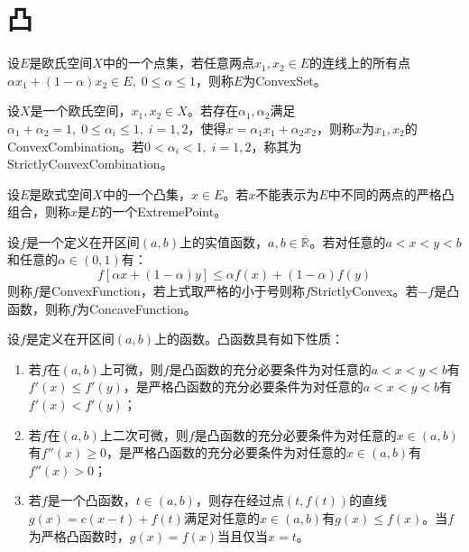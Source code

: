 \chapter{凸}

\begin{definition}
	设$E$是欧氏空间$X$中的一个点集，若任意两点$x_1,x_2\in E$的连线上的所有点$\alpha x_1+(1-\alpha)x_2\in E,\;0\leqslant\alpha\leqslant1$，则称$E$为\gls{ConvexSet}。
\end{definition}
\begin{definition}
	设$X$是一个欧氏空间，$x_1,x_2\in X$。若存在$\alpha_1,\alpha_2$满足$\alpha_1+\alpha_2=1,\;0\leqslant\alpha_i\leqslant1,\;i=1,2$，使得$x=\alpha_1x_1+\alpha_2x_2$，则称$x$为$x_1,x_2$的\gls{ConvexCombination}。若$0<\alpha_i<1,\;i=1,2$，称其为\gls{StrictlyConvexCombination}。
\end{definition}
\begin{definition}
	设$E$是欧式空间$X$中的一个凸集，$x\in E$。若$x$不能表示为$E$中不同的两点的严格凸组合，则称$x$是$E$的一个\gls{ExtremePoint}。
\end{definition}

\begin{definition}
	设$f$是一个定义在开区间$(a,b)$上的实值函数，$a,b\in\overline{\mathbb{R}^{}}$。若对任意的$a<x<y<b$和任意的$\alpha\in(0,1)$有：
	\begin{equation*}
		f[\alpha x+(1-\alpha)y]\leqslant\alpha f(x)+(1-\alpha)f(y)
	\end{equation*}
	则称$f$是\gls{ConvexFunction}，若上式取严格的小于号则称$f$\gls{StrictlyConvex}。若$-f$是凸函数，则称$f$为\gls{ConcaveFunction}。
\end{definition}
\begin{property}\label{prop:ConvexFunction}
	设$f$是定义在开区间$(a,b)$上的函数。凸函数具有如下性质：
	\begin{enumerate}
		\item 若$f$在$(a,b)$上可微，则$f$是凸函数的充分必要条件为对任意的$a<x<y<b$有$f'(x)\leqslant f'(y)$，是严格凸函数的充分必要条件为对任意的$a<x<y<b$有$f'(x)<f'(y)$；
		\item 若$f$在$(a,b)$上二次可微，则$f$是凸函数的充分必要条件为对任意的$x\in(a,b)$有$f''(x)\geqslant0$，是严格凸函数的充分必要条件为对任意的$x\in(a,b)$有$f''(x)>0$；
		\item 若$f$是一个凸函数，$t\in(a,b)$，则存在经过点$(t,f(t))$的直线$g(x)=c(x-t)+f(t)$满足对任意的$x\in(a,b)$有$g(x)\leqslant f(x)$。当$f$为严格凸函数时，$g(x)=f(x)$当且仅当$x=t$。
	\end{enumerate}
\end{property}

